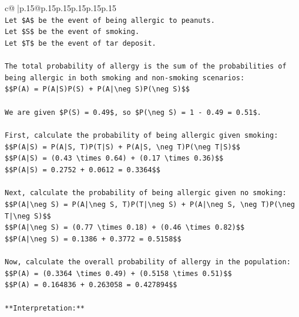 \documentclass{article}
\begin{document}
{\begin{supertabular}{c@{$\;$}|p{.15\linewidth}@{}p{.15\linewidth}p{.15\linewidth}p{.15\linewidth}p{.15\linewidth}p{.15\linewidth}}
{{{\\ 
\texttt{Let \$A\$ be the event of being allergic to peanuts.} \\
\texttt{Let \$S\$ be the event of smoking.} \\
\texttt{Let \$T\$ be the event of tar deposit.} \\
\\ 
\texttt{The total probability of allergy is the sum of the probabilities of being allergic in both smoking and non{-}smoking scenarios:} \\
\texttt{\$\$P(A) = P(A|S)P(S) + P(A|\textbackslash{}neg S)P(\textbackslash{}neg S)\$\$} \\
\\ 
\texttt{We are given \$P(S) = 0.49\$, so \$P(\textbackslash{}neg S) = 1 {-} 0.49 = 0.51\$.} \\
\\ 
\texttt{First, calculate the probability of being allergic given smoking:} \\
\texttt{\$\$P(A|S) = P(A|S, T)P(T|S) + P(A|S, \textbackslash{}neg T)P(\textbackslash{}neg T|S)\$\$} \\
\texttt{\$\$P(A|S) = (0.43 \textbackslash{}times 0.64) + (0.17 \textbackslash{}times 0.36)\$\$} \\
\texttt{\$\$P(A|S) = 0.2752 + 0.0612 = 0.3364\$\$} \\
\\ 
\texttt{Next, calculate the probability of being allergic given no smoking:} \\
\texttt{\$\$P(A|\textbackslash{}neg S) = P(A|\textbackslash{}neg S, T)P(T|\textbackslash{}neg S) + P(A|\textbackslash{}neg S, \textbackslash{}neg T)P(\textbackslash{}neg T|\textbackslash{}neg S)\$\$} \\
\texttt{\$\$P(A|\textbackslash{}neg S) = (0.77 \textbackslash{}times 0.18) + (0.46 \textbackslash{}times 0.82)\$\$} \\
\texttt{\$\$P(A|\textbackslash{}neg S) = 0.1386 + 0.3772 = 0.5158\$\$} \\
\\ 
\texttt{Now, calculate the overall probability of allergy in the population:} \\
\texttt{\$\$P(A) = (0.3364 \textbackslash{}times 0.49) + (0.5158 \textbackslash{}times 0.51)\$\$} \\
\texttt{\$\$P(A) = 0.164836 + 0.263058 = 0.427894\$\$} \\
\\ 
\texttt{**Interpretation:**} \\
\\ 
}}}
\end{supertabular}}
\end{document}
